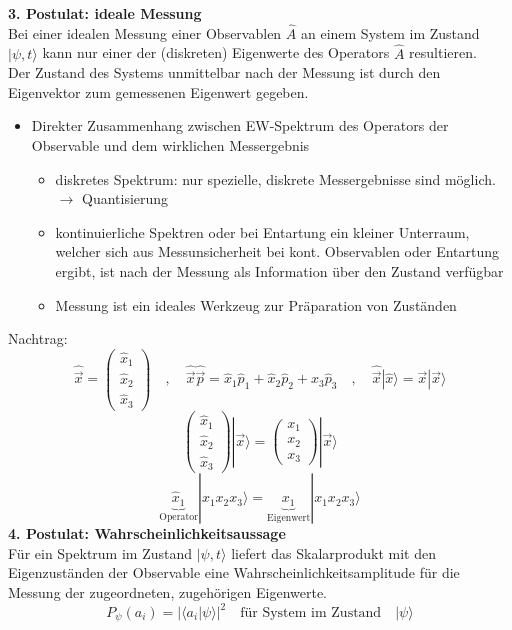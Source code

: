 \documentclass[10pt,article,colorback,accentcolor=tud9d]{scrartcl}
\begin{document}
  \textbf{3. Postulat: ideale Messung}\\
    Bei einer idealen Messung einer Observablen $\hat{A}$ an einem System im Zustand $|\psi,t\rangle$ kann nur einer der (diskreten) Eigenwerte des Operators $\hat{A}$ resultieren.\\
    Der Zustand des Systems unmittelbar nach der Messung ist durch den Eigenvektor zum gemessenen Eigenwert gegeben.
    \begin{itemize}
      \item Direkter Zusammenhang zwischen EW-Spektrum des Operators der Observable und dem wirklichen Messergebnis
        \begin{itemize}
          \item diskretes Spektrum: nur spezielle, diskrete Messergebnisse sind möglich. $\rightarrow$ Quantisierung
          \item kontinuierliche Spektren oder bei Entartung ein kleiner Unterraum, welcher sich aus Messunsicherheit bei kont. Observablen oder Entartung ergibt, ist nach der Messung als Information über den Zustand verfügbar
          \item Messung ist ein ideales Werkzeug zur Präparation von Zuständen
        \end{itemize}
    \end{itemize}
    Nachtrag: 
    \begin{equation}
      \hat{\vec{x}}=\left(\begin{array}{c} \hat{x}_1 \\ \hat{x}_2 \\ \hat{x}_3 \end{array}\right) \quad, \quad \hat{\vec{x}}\hat{\vec{p}}=\hat{x}_1\hat{p}_1 + \hat{x}_2\hat{p}_2 + \hat{x}_3\hat{p}_3 \quad, \quad \hat{\vec{x}}|\hat{x}\rangle=\vec{x}|\vec{x}\rangle
    \end{equation}
    \begin{equation}
    \left(\begin{array}{c} \hat{x}_1 \\ \hat{x}_2 \\ \hat{x}_3 \end{array}\right)|\vec{x}\rangle=\left(\begin{array}{c} x_1 \\ x_2 \\ x_3 \end{array}\right)|\vec{x}\rangle
    \end{equation}
    \begin{equation}
    \underbrace{\hat{x}_1}_{\text{Operator}}|x_1x_2x_3\rangle=\underbrace{x_1}_{\text{Eigenwert}}|x_1x_2x_3\rangle
    \end{equation}
  \textbf{4. Postulat: Wahrscheinlichkeitsaussage}\\
    Für ein Spektrum im Zustand $|\psi,t\rangle$ liefert das Skalarprodukt mit den Eigenzuständen der Observable eine Wahrscheinlichkeitsamplitude für die Messung der zugeordneten, zugehörigen Eigenwerte.
    \begin{equation}
      P_\psi(a_i)=\left|\langle a_i|\psi\rangle\right|^2 \quad \text{für System im Zustand} \quad |\psi\rangle
    \end{equation}
\end{document}
